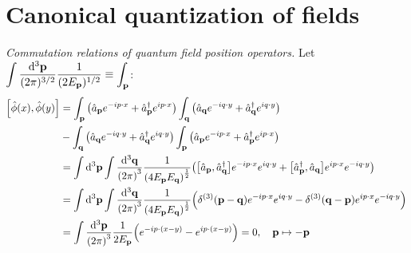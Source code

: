 \documentclass{report}
\begin{document}
\chapter{Canonical quantization of fields}

\begin{subquests}
	\item \emph{Commutation relations of quantum field position operators.} Let $\displaystyle \int \frac{\dd^3{\vb p}}{(2\pi)^{3/2}}\frac{1}{(2E_{\vb p})^{1/2}} \equiv \displaystyle \int_{\vb p}$:
	\begin{align*}
		\bqty{\hat{\phi}(x),\hat{\phi}(y)} & = \int_{\vb p} \pqty{\hat{a}_{\vb p}e^{-i p \cdot x} + \hat{a}^{\dagger}_{\vb p}e^{i p \cdot x}} \int_{\vb q}\pqty{\hat{a}_{\vb q}e^{-i q \cdot y} + \hat{a}^{\dagger}_{\vb q}e^{i q \cdot y}} \\
		& - \int_{\vb q}\pqty{\hat{a}_{\vb q}e^{-i q \cdot y} + \hat{a}^{\dagger}_{\vb q}e^{i q \cdot y}} \int_{\vb p} \pqty{\hat{a}_{\vb p}e^{-i p \cdot x} + \hat{a}^{\dagger}_{\vb p}e^{i p \cdot x}} \\
		& = \int \dd^3{\vb p}\int \frac{\dd^3{\vb q}}{\pqty{2\pi}^3}\frac{1}{\pqty{4E_{\vb p}E_{\vb q}}^{\frac{1}{2}}}\pqty{\bqty{\hat{a}_{\vb p},\hat{a}^{\dagger}_{\vb q}}e^{-i p \cdot x}e^{i q \cdot y} + \bqty{\hat{a}^{\dagger}_{\vb p},\hat{a}_{\vb q}}e^{i p \cdot x}e^{-i q \cdot y}} \\
		& = \int \dd^3{\vb p}\int \frac{\dd^3{\vb q}}{\pqty{2\pi}^3}\frac{1}{\pqty{4E_{\vb p}E_{\vb q}}^{\frac{1}{2}}}\pqty{\delta^{(3)}\pqty{\vb p - \vb q}e^{-i p \cdot x}e^{i q \cdot y} - \delta^{(3)}\pqty{\vb q - \vb p}e^{i p \cdot x}e^{-i q \cdot y}} \\
		& = \int\frac{\dd^3{\vb p}}{\pqty{2\pi}^3}\frac{1}{2E_{\vb p}}\pqty{e^{-i p\cdot (x - y)} - e^{i p \cdot(x - y)}} = 0, \quad \vb p \mapsto -\vb p
	\end{align*}


\end{subquests}
\end{document}
